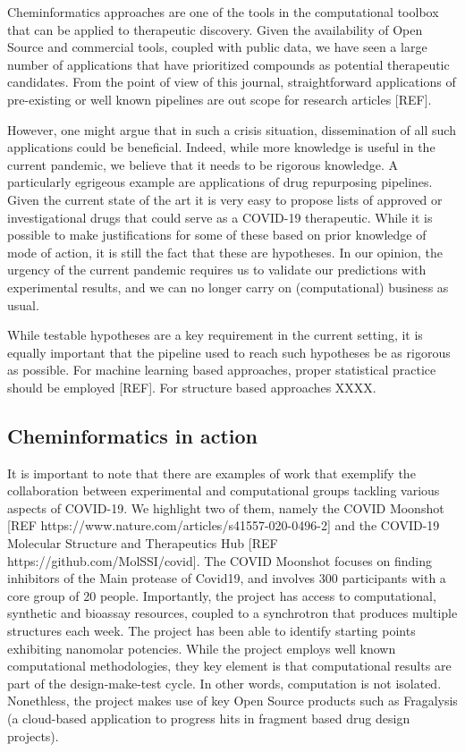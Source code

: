 \documentclass{bmcart}
\begin{document}
Cheminformatics approaches are one of the tools in the computational
toolbox that can be applied to therapeutic discovery. Given the
availability of Open Source and commercial tools, coupled with public
data, we have seen a large number of applications that have
prioritized compounds as potential therapeutic candidates. From the
point of view of this journal, straightforward applications of
pre-existing or well known pipelines are out scope for research
articles [REF].

However, one might argue that in such a crisis situation,
dissemination of all such applications could be beneficial. Indeed,
while more knowledge is useful in
the current pandemic, we believe that it needs to be rigorous
knowledge. A particularly egrigeous example are applications of drug
repurposing pipelines. Given the current state of the art it is very
easy to propose lists of approved or investigational drugs that could
serve as a COVID-19 therapeutic. While it is possible to make
justifications for some of these based on prior knowledge of mode of
action, it is still the fact that these are hypotheses. In our opinion,
the urgency of the current pandemic requires us to validate our
predictions with experimental results, and we can no longer carry on
(computational) business as usual.

While testable hypotheses are a key requirement in the current
setting, it is equally important that the pipeline used to reach such
hypotheses be as rigorous as possible. For machine learning based
approaches, proper statistical practice should be employed [REF]. For
structure based approaches XXXX.

\subsection*{Cheminformatics in action}
\label{sec:chem-acti}

It is important to note that there are examples of work that exemplify
the collaboration between experimental and computational groups
tackling various aspects of COVID-19. We highlight two of them, namely
the COVID Moonshot [REF
https://www.nature.com/articles/s41557-020-0496-2] and the COVID-19
Molecular Structure and Therapeutics Hub [REF
https://github.com/MolSSI/covid]. The COVID Moonshot focuses on
finding inhibitors of the Main protease of Covid19, and involves 300
participants with a core group of 20 people. Importantly, the project
has access to computational, synthetic and bioassay resources, coupled
to a synchrotron that produces multiple structures each week. The
project has been able to identify starting points exhibiting
nanomolar potencies. While the project employs well known
computational methodologies, they key element is that
computational results are part of the design-make-test
cycle. In other words, computation is not isolated. Nonethless, the
project makes use of key Open Source products such as Fragalysis (a
cloud-based application to progress hits in fragment based drug design
projects).
\end{document}
